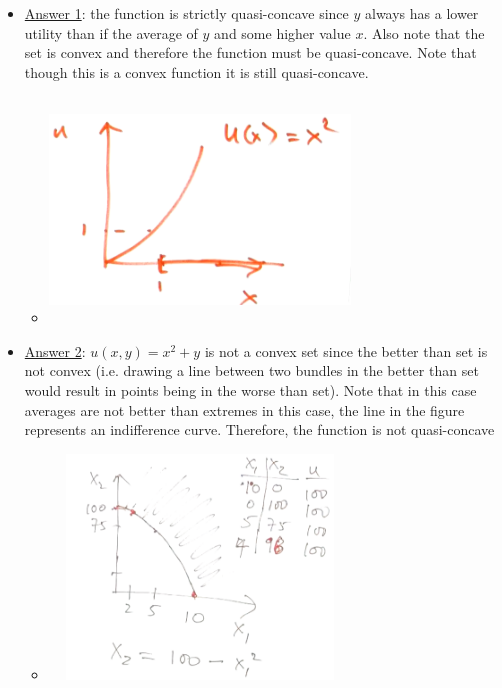 \documentclass{article}
\begin{document}
  \begin{itemize}
    \item  \underline{Answer 1}: the function is strictly quasi-concave since $y$ always has a lower utility than if the average of $y$ and some higher value $x$. Also note that the set is convex and therefore the function must be quasi-concave. Note that though this is a convex function it is still quasi-concave.
    \begin{itemize}
      \item  \includegraphics[width=8cm, height=6cm]{pic19}
    \end{itemize}
    \item  \underline{Answer 2}: $u(x,y) = x^{2} + y$ is not a convex set since the better than set is not convex (i.e. drawing a line between two bundles in the better than set would result in points being in the worse than set). Note that in this case averages are not better than extremes in this case, the line in the figure represents an indifference curve. Therefore, the function is not quasi-concave
    \begin{itemize}
      \item  \includegraphics[width=8cm, height=6cm]{pic18}
    \end{itemize}
  \end{itemize}
  \par
\vspace{6mm}
\end{document}
